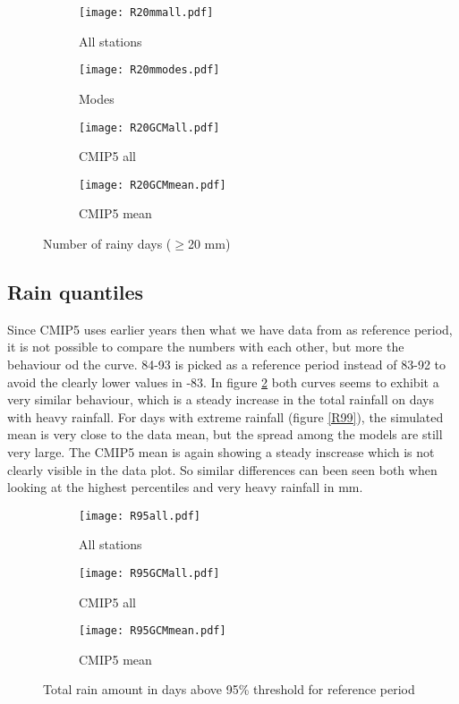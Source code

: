 \documentclass{article}
\begin{document}
	\begin{figure}[H]
		\centering
		\begin{subfigure}{0.5\textwidth}
			\centering
			\texttt{[image: R20mmall.pdf]}
			\caption{All stations}
		\end{subfigure}%
		\begin{subfigure}{0.5\textwidth}
			\centering
			\texttt{[image: R20mmodes.pdf]}
			\caption{Modes}
		\end{subfigure}
		\begin{subfigure}{0.5\textwidth}
			\centering
			\texttt{[image: R20GCMall.pdf]}
			\caption{CMIP5 all}
		\end{subfigure}%
		\begin{subfigure}{0.5\textwidth}
			\centering
			\texttt{[image: R20GCMmean.pdf]}
			\caption{CMIP5 mean}
		\end{subfigure}
		\caption{Number of rainy days ($\geq$20 mm)}
		\label{R20mm}
	\end{figure}

	\subsection{Rain quantiles}
	Since CMIP5 uses earlier years then what we have data from as reference period, it is not possible to compare the numbers with each other, but more the behaviour od the curve. 84-93 is picked as a reference period instead of 83-92 to avoid the clearly lower values in -83. In figure \ref{R95} both curves seems to exhibit a very similar behaviour, which is a steady increase in the total rainfall on days with heavy rainfall. For days with extreme rainfall (figure \ref{R99}), the simulated mean is very close to the data mean, but the spread among the models are still very large. The CMIP5 mean is again showing a steady inscrease which is not clearly visible in the data plot. So similar differences can been seen both when looking at the highest percentiles and very heavy rainfall in mm. 
	\begin{figure}[H]
		\centering
		\begin{subfigure}{0.5\textwidth}
			\centering
			\texttt{[image: R95all.pdf]}
			\caption{All stations}
		\end{subfigure}%
		\begin{subfigure}{0.5\textwidth}
			\centering
			\texttt{[image: R95GCMall.pdf]}
			\caption{CMIP5 all}
		\end{subfigure}
		\begin{subfigure}{0.5\textwidth}
			\centering
			\texttt{[image: R95GCMmean.pdf]}
			\caption{CMIP5 mean}
		\end{subfigure}
		\caption{Total rain amount in days above 95\% threshold for reference period}
		\label{R95}
	\end{figure}
\end{document}
